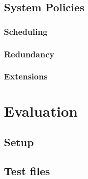 \documentclass{acm_proc_article-sp}
\begin{document}
\subsection{System Policies}

\subsubsection{Scheduling}

\subsubsection{Redundancy}

\subsubsection{Extensions}

\section{Evaluation}
\label{sec_eval}

\subsection{Setup}

\subsection{Test files}
\end{document}
